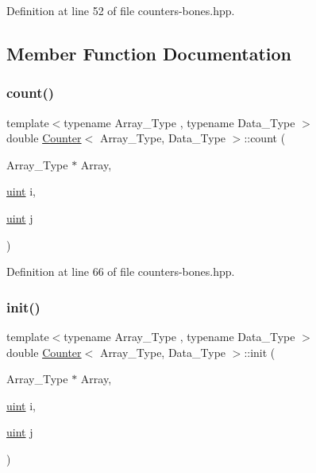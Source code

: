 Definition at line 52 of file counters-\/bones.\+hpp.



\subsection{Member Function Documentation}
\mbox{\label{class_counter_afe1d23e72c3bdca9b2481f36ebde1d95}} 
\subsubsection{\texorpdfstring{count()}{count()}}
{\footnotesize\ttfamily template$<$typename Array\+\_\+\+Type , typename Data\+\_\+\+Type $>$ \\
double \hyperlink{class_counter}{Counter}$<$ Array\+\_\+\+Type, Data\+\_\+\+Type $>$\+::count (\begin{DoxyParamCaption}\item[{Array\+\_\+\+Type $\ast$}]{Array,  }\item[{\hyperlink{typedefs_8hpp_a91ad9478d81a7aaf2593e8d9c3d06a14}{uint}}]{i,  }\item[{\hyperlink{typedefs_8hpp_a91ad9478d81a7aaf2593e8d9c3d06a14}{uint}}]{j }\end{DoxyParamCaption})\hspace{0.3cm}{\ttfamily [inline]}}



Definition at line 66 of file counters-\/bones.\+hpp.

\mbox{\label{class_counter_ae0451979ddc51a5fbf00de78c37d3216}} 
\subsubsection{\texorpdfstring{init()}{init()}}
{\footnotesize\ttfamily template$<$typename Array\+\_\+\+Type , typename Data\+\_\+\+Type $>$ \\
double \hyperlink{class_counter}{Counter}$<$ Array\+\_\+\+Type, Data\+\_\+\+Type $>$\+::init (\begin{DoxyParamCaption}\item[{Array\+\_\+\+Type $\ast$}]{Array,  }\item[{\hyperlink{typedefs_8hpp_a91ad9478d81a7aaf2593e8d9c3d06a14}{uint}}]{i,  }\item[{\hyperlink{typedefs_8hpp_a91ad9478d81a7aaf2593e8d9c3d06a14}{uint}}]{j }\end{DoxyParamCaption})\hspace{0.3cm}{\ttfamily [inline]}}



